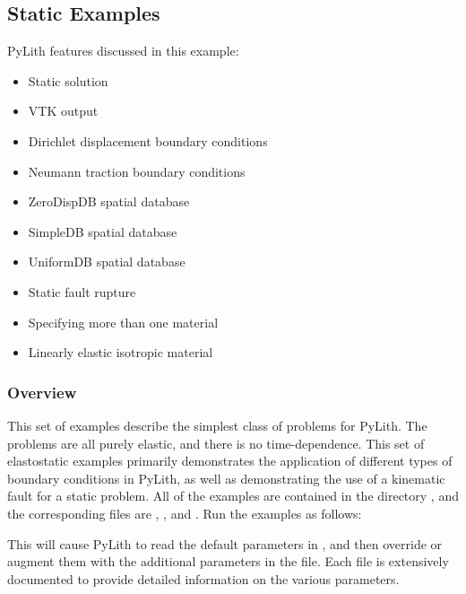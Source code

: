 \subsection{Static Examples}
\label{sec:example:3dhex8-static}

PyLith features discussed in this example:
\begin{itemize}
\item Static solution
\item VTK output
\item Dirichlet displacement boundary conditions
\item Neumann traction boundary conditions
\item ZeroDispDB spatial database
\item SimpleDB spatial database
\item UniformDB spatial database
\item Static fault rupture
\item Specifying more than one material
\item Linearly elastic isotropic material
\end{itemize}

\subsubsection{Overview}

This set of examples describe the simplest class of problems for PyLith.
The problems are all purely elastic, and there is no time-dependence.
This set of elastostatic examples primarily demonstrates the application
of different types of boundary conditions in PyLith, as well as demonstrating
the use of a kinematic fault for a static problem. All of the examples
are contained in the directory , and the
corresponding  files are , ,
and . Run the examples as follows:
This will cause PyLith to read the default parameters in ,
and then override or augment them with the additional parameters in
the  file. Each  file is extensively
documented to provide detailed information on the various parameters.



